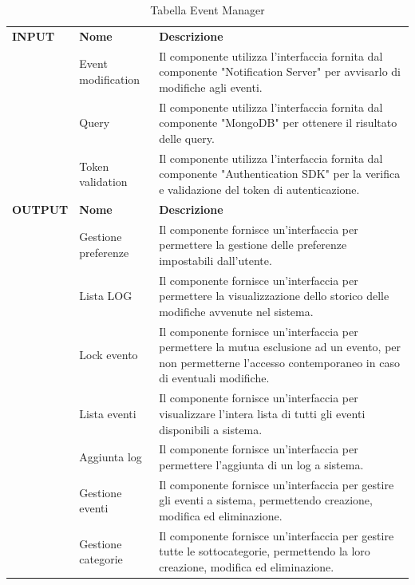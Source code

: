 \documentclass{article}
\begin{document}
\begin{table}[htbp]
    \centering
    \renewcommand{\arraystretch}{1.3} %
    \begin{tabularx}{\textwidth}{| l | l | X |}
        \Xhline{2pt}
        \textbf{INPUT} & \textbf{Nome} & \textbf{Descrizione} \\
        \Xhline{2pt}
         & Event modification & Il componente utilizza l'interfaccia fornita dal componente "Notification Server" per avvisarlo di modifiche agli eventi. \\
        \hline
         & Query & Il componente utilizza l'interfaccia fornita dal componente "MongoDB" per ottenere il risultato delle query. \\
        \hline
         & Token validation & Il componente utilizza l'interfaccia fornita dal componente "Authentication SDK" per la verifica e validazione del token di autenticazione. \\
        \Xhline{2pt}
        \textbf{OUTPUT} & \textbf{Nome} & \textbf{Descrizione} \\
        \Xhline{2pt}
         & Gestione preferenze & Il componente fornisce un'interfaccia per permettere la gestione delle preferenze impostabili dall'utente. \\
        \hline
         & Lista LOG & Il componente fornisce un'interfaccia per permettere la visualizzazione dello storico delle modifiche avvenute nel sistema. \\
        \hline
        & Lock evento & Il componente fornisce un'interfaccia per permettere la mutua esclusione ad un evento, per non permetterne l'accesso contemporaneo in caso di eventuali modifiche. \\
        \hline
        & Lista eventi & Il componente fornisce un'interfaccia per visualizzare l'intera lista di tutti gli eventi disponibili a sistema. \\
        \hline
        & Aggiunta log & Il componente fornisce un'interfaccia per permettere l'aggiunta di un log a sistema. \\
        \hline
        & Gestione eventi & Il componente fornisce un'interfaccia per gestire gli eventi a sistema, permettendo creazione, modifica ed eliminazione. \\
        \hline
        & Gestione categorie & Il componente fornisce un'interfaccia per gestire tutte le sottocategorie, permettendo la loro creazione, modifica ed eliminazione. \\
        \hline
    \end{tabularx}
    \caption{Tabella Event Manager}
\end{table}
\end{document}
